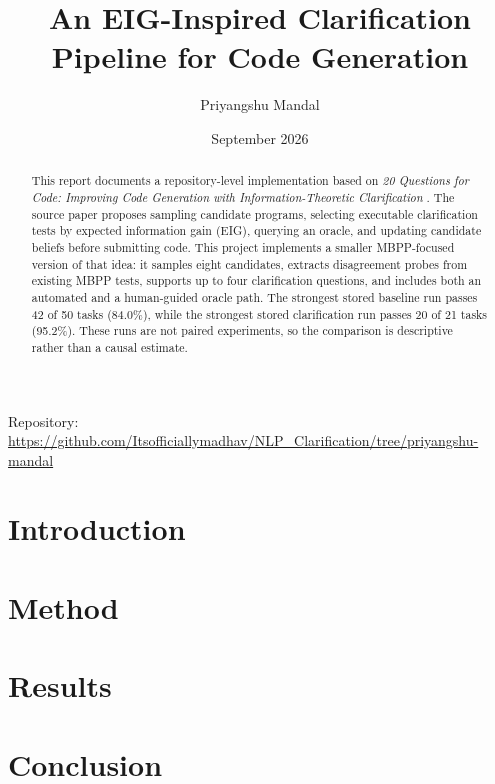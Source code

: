 \documentclass[11pt]{article}
\title{An EIG-Inspired Clarification Pipeline for Code Generation}
\author{Priyangshu Mandal}
\date{September 2026}
\begin{document}
\maketitle
\begin{center}
Repository: \url{https://github.com/Itsofficiallymadhav/NLP_Clarification/tree/priyangshu-mandal}
\end{center}
\tableofcontents

\begin{abstract}
This report documents a repository-level implementation based on \emph{20 Questions for Code: Improving Code Generation with Information-Theoretic Clarification} \cite{garg2026twenty}. The source paper proposes sampling candidate programs, selecting executable clarification tests by expected information gain (EIG), querying an oracle, and updating candidate beliefs before submitting code. This project implements a smaller MBPP-focused version of that idea: it samples eight candidates, extracts disagreement probes from existing MBPP tests, supports up to four clarification questions, and includes both an automated and a human-guided oracle path. The strongest stored baseline run passes 42 of 50 tasks (84.0\%), while the strongest stored clarification run passes 20 of 21 tasks (95.2\%). These runs are not paired experiments, so the comparison is descriptive rather than a causal estimate.
\end{abstract}

\newpage

\section{Introduction}


\section{Method}


\section{Results}


\section{Conclusion}




\end{document}
